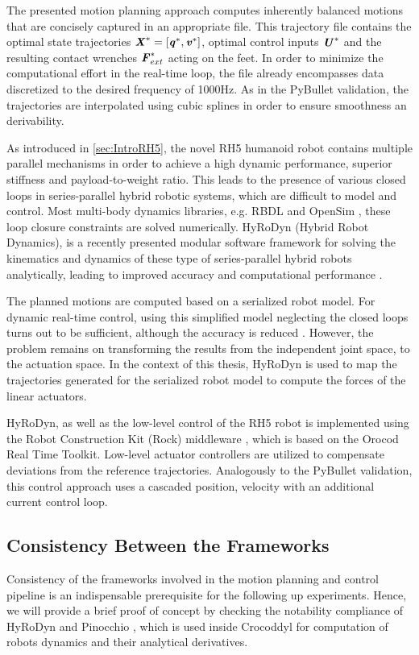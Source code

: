 The presented motion planning approach computes inherently balanced motions that are concisely captured in an appropriate file. This trajectory file contains the optimal state trajectories $\bm{\mathit{X}}^*=[\bm{\mathit{q}}^*,\bm{\mathit{v}}^*]$, optimal control inputs $\bm{\mathit{U}}^*$ and the resulting contact wrenches $\bm{\mathit{F}}_{ext}^*$ acting on the feet. In order to minimize the computational effort in the real-time loop, the file already encompasses data discretized to the desired frequency of 1000Hz. As in the PyBullet validation, the trajectories are interpolated using cubic splines in order to ensure smoothness an derivability. 

As introduced in \cref{sec:IntroRH5}, the novel RH5 humanoid robot contains multiple parallel mechanisms in order to achieve a high dynamic performance, superior stiffness and payload-to-weight ratio. This leads to the presence of various closed loops in series-parallel hybrid robotic systems, which are difficult to model and control. Most multi-body dynamics libraries, e.g. RBDL \cite{felis2017rbdl} and OpenSim \cite{delp2007opensim}, these loop closure constraints are solved numerically. HyRoDyn (Hybrid Robot Dynamics), is a recently presented modular software framework for solving the kinematics and dynamics of these type of series-parallel hybrid robots analytically, leading to improved accuracy and computational performance \cite{kumar2018hyrodyn}.

The planned motions are computed based on a serialized robot model. For dynamic real-time control, using this simplified model neglecting the closed loops turns out to be sufficient, although the accuracy is reduced \cite{kumar2019model}. However, the problem remains on transforming the results from the independent joint space, to the actuation space. In the context of this thesis, HyRoDyn is used to map the trajectories generated for the serialized robot model to compute the forces of the linear actuators.

HyRoDyn, as well as the low-level control of the RH5 robot is implemented using the Robot Construction Kit (Rock) middleware \cite{joyeux2013rock}, which is based on the Orocod Real Time Toolkit. Low-level actuator controllers are utilized to compensate deviations from the reference trajectories. Analogously to the PyBullet validation, this control approach uses a cascaded position, velocity with an additional current control loop. 

\subsection{Consistency Between the Frameworks}
Consistency of the frameworks involved in the motion planning and control pipeline is an indispensable prerequisite for the following up experiments. Hence, we will provide a brief proof of concept by checking the notability compliance of HyRoDyn and Pinocchio \cite{carpentier2019pinocchio}, which is used inside Crocoddyl for computation of robots dynamics and their analytical derivatives.   
